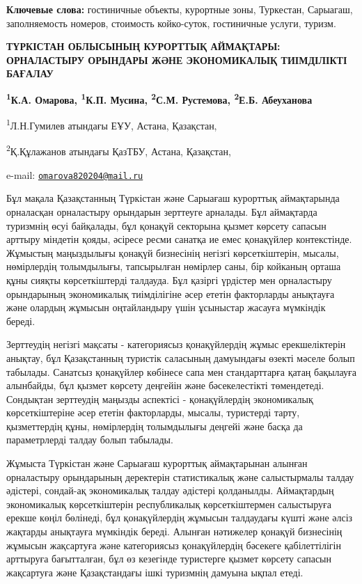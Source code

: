 {\bfseries Ключевые слова:} гостиничные объекты, курортные зоны, Туркестан,
Сарыагаш, заполняемость номеров, стоимость койко-суток, гостиничные
услуги, туризм.

\begin{articleheader}
{\bfseries ТҮРКІСТАН ОБЛЫСЫНЫҢ КУРОРТТЫҚ АЙМАҚТАРЫ: ОРНАЛАСТЫРУ ОРЫНДАРЫ
ЖӘНЕ ЭКОНОМИКАЛЫҚ ТИІМДІЛІКТІ БАҒАЛАУ}

{\bfseries
\textsuperscript{1}К.А. Омарова\textsuperscript{\envelope },
\textsuperscript{1}К.П. Мусина,
\textsuperscript{2}С.М. Рустемова,
\textsuperscript{2}Е.Б. Абеуханова
}
\end{articleheader}

\begin{affiliation}
\textsuperscript{1}Л.Н.Гумилев атындағы ЕҰУ, Астана, Қазақстан,

\textsuperscript{2}Қ.Құлажанов атындағы ҚазТБУ, Астана, Қазақстан,

e-mail: \href{mailto:omarova820204@mail.ru}{\nolinkurl{omarova820204@mail.ru}}
\end{affiliation}

Бұл мақала Қазақстанның Түркістан және Сарыағаш курорттық аймақтарында
орналасқан орналастыру орындарын зерттеуге арналады. Бұл аймақтарда
туризмнің өсуі байқалады, бұл қонақүй секторына қызмет көрсету сапасын
арттыру міндетін қояды, әсіресе ресми санатқа ие емес қонақүйлер
контекстінде. Жұмыстың маңыздылығы қонақүй бизнесінің негізгі
көрсеткіштерін, мысалы, нөмірлердің толымдылығы, тапсырылған нөмірлер
саны, бір койканың орташа құны сияқты көрсеткіштерді талдауда. Бұл
қазіргі үрдістер мен орналастыру орындарының экономикалық тиімділігіне
әсер ететін факторларды анықтауға және олардың жұмысын оңтайландыру үшін
ұсыныстар жасауға мүмкіндік береді.

Зерттеудің негізгі мақсаты - категориясыз қонақүйлердің жұмыс
ерекшеліктерін анықтау, бұл Қазақстанның туристік саласының дамуындағы
өзекті мәселе болып табылады. Санатсыз қонақүйлер көбінесе сапа мен
стандарттарға қатаң бақылауға алынбайды, бұл қызмет көрсету деңгейін
және бәсекелестікті төмендетеді. Сондықтан зерттеудің маңызды аспектісі
- қонақүйлердің экономикалық көрсеткіштеріне әсер ететін факторларды,
мысалы, туристерді тарту, қызметтердің құны, нөмірлердің толымдылығы
деңгейі және басқа да параметрлерді талдау болып табылады.

Жұмыста Түркістан және Сарыағаш курорттық аймақтарынан алынған
орналастыру орындарының деректерін статистикалық және салыстырмалы
талдау әдістері, сондай-ақ экономикалық талдау әдістері қолданылды.
Аймақтардың экономикалық көрсеткіштерін республикалық көрсеткіштермен
салыстыруға ерекше көңіл бөлінеді, бұл қонақүйлердің жұмысын талдаудағы
күшті және әлсіз жақтарды анықтауға мүмкіндік береді. Алынған нәтижелер
қонақүй бизнесінің жұмысын жақсартуға және категориясыз қонақүйлердің
бәсекеге қабілеттілігін арттыруға бағытталған, бұл өз кезегінде
туристерге қызмет көрсету сапасын жақсартуға және Қазақстандағы ішкі
туризмнің дамуына ықпал етеді.

